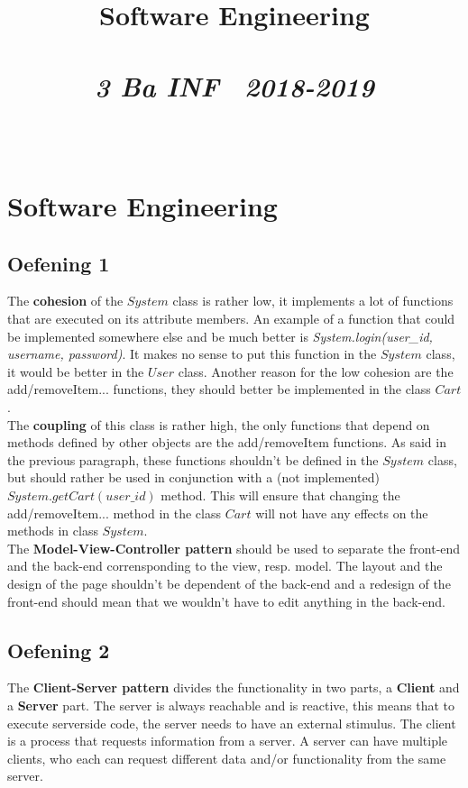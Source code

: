 \documentclass{article}
\title{\textmd{\textbf{Software Engineering}}\\\normalsize\vspace{0.1in}\Large{\assignmentname}\\\vspace{0.1in}\small{\textit{3 Ba INF \  2018-2019}}}
\author{\studentA \\ \studentB}
\begin{document}
\maketitle

\section{Software Engineering}

\subsection{Oefening 1}
The \textbf{cohesion} of the $System$ class is rather low, it implements a lot of functions that are executed on its attribute members. An example of a function that could be implemented somewhere else and be much better is \textit{System.login(user\_id, username, password)}. It makes no sense to put this function in the $System$ class, it would be better in the $User$ class. Another reason for the low cohesion are the add/removeItem... functions, they should better be implemented in the class $Cart$. \\

The \textbf{coupling} of this class is rather high, the only functions that depend on methods defined by other objects are the add/removeItem functions. As said in the previous paragraph, these functions shouldn't be defined in the $System$ class, but should rather be used in conjunction with a (not implemented) $System.getCart(user\_id)$ method. This will ensure that changing the add/removeItem... method in the class $Cart$ will not have any effects on the methods in class $System$. \\

The \textbf{Model-View-Controller pattern} should be used to separate the front-end and the back-end corrensponding to the view, resp. model. The layout and the design of the page shouldn't be dependent of the back-end and a redesign of the front-end should mean that we wouldn't have to edit anything in the back-end. \\

\subsection{Oefening 2}

The \textbf{Client-Server pattern} divides the functionality in two parts, a \textbf{Client} and a \textbf{Server} part. The server is always reachable and is reactive, this means that to execute serverside code, the server needs to have an external stimulus. The client is a process that requests information from a server. A server can have multiple clients, who each can request different data and/or functionality from the same server. \\
\end{document}
